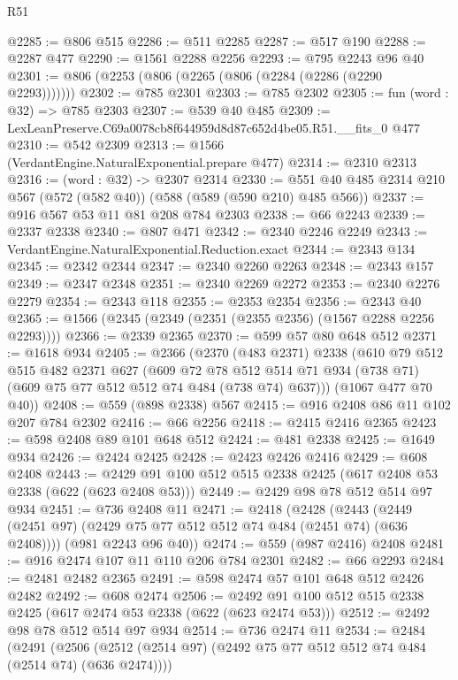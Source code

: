 \begin{lexlean}{R51}
\begin{coremodule}
@2285 := @806 @515
@2286 := @511 @2285
@2287 := @517 @190
@2288 := @2287 @477
@2290 := @1561 @2288 @2256
@2293 := @795 @2243 @96 @40
@2301 := @806 (@2253 (@806 (@2265 (@806 (@2284 (@2286 (@2290 @2293)))))))
@2302 := @785 @2301
@2303 := @785 @2302
@2305 := fun (word : @32) => @785 @2303
@2307 := @539 @40 @485
@2309 := LexLeanPreserve.C69a0078cb8f644959d8d87c652d4be05.R51.__fits_0 @477
@2310 := @542 @2309
@2313 := @1566 (VerdantEngine.NaturalExponential.prepare @477)
@2314 := @2310 @2313
@2316 := (word : @32) -> @2307 @2314
@2330 := @551 @40 @485 @2314 @210 @567 (@572 (@582 @40)) (@588 (@589 (@590 @210) @485 @566))
@2337 := @916 @567 @53 @11 @81 @208 @784 @2303
@2338 := @66 @2243
@2339 := @2337 @2338
@2340 := @807 @471
@2342 := @2340 @2246 @2249
@2343 := VerdantEngine.NaturalExponential.Reduction.exact
@2344 := @2343 @134
@2345 := @2342 @2344
@2347 := @2340 @2260 @2263
@2348 := @2343 @157
@2349 := @2347 @2348
@2351 := @2340 @2269 @2272
@2353 := @2340 @2276 @2279
@2354 := @2343 @118
@2355 := @2353 @2354
@2356 := @2343 @40
@2365 := @1566 (@2345 (@2349 (@2351 (@2355 @2356) (@1567 @2288 @2256 @2293))))
@2366 := @2339 @2365
@2370 := @599 @57 @80 @648 @512
@2371 := @1618 @934
@2405 := @2366
    (@2370
      (@483 @2371)
      @2338
      (@610
        @79
        @512
        @515
        @482
        @2371
        @627
        (@609
          @72
          @78
          @512
          @514
          @71
          @934
          (@738 @71)
          (@609 @75 @77 @512 @512 @74 @484 (@738 @74) @637)))
      (@1067 @477 @70 @40))
@2408 := @559 (@898 @2338) @567
@2415 := @916 @2408 @86 @11 @102 @207 @784 @2302
@2416 := @66 @2256
@2418 := @2415 @2416 @2365
@2423 := @598 @2408 @89 @101 @648 @512
@2424 := @481 @2338
@2425 := @1649 @934
@2426 := @2424 @2425
@2428 := @2423 @2426 @2416
@2429 := @608 @2408
@2443 := @2429 @91 @100 @512 @515 @2338 @2425 (@617 @2408 @53 @2338 (@622 (@623 @2408 @53)))
@2449 := @2429 @98 @78 @512 @514 @97 @934
@2451 := @736 @2408 @11
@2471 := @2418
    (@2428
      (@2443 (@2449 (@2451 @97) (@2429 @75 @77 @512 @512 @74 @484 (@2451 @74) (@636 @2408))))
      (@981 @2243 @96 @40))
@2474 := @559 (@987 @2416) @2408
@2481 := @916 @2474 @107 @11 @110 @206 @784 @2301
@2482 := @66 @2293
@2484 := @2481 @2482 @2365
@2491 := @598 @2474 @57 @101 @648 @512 @2426 @2482
@2492 := @608 @2474
@2506 := @2492 @91 @100 @512 @515 @2338 @2425 (@617 @2474 @53 @2338 (@622 (@623 @2474 @53)))
@2512 := @2492 @98 @78 @512 @514 @97 @934
@2514 := @736 @2474 @11
@2534 := @2484
    (@2491
      (@2506 (@2512 (@2514 @97) (@2492 @75 @77 @512 @512 @74 @484 (@2514 @74) (@636 @2474))))

\end{coremodule}
\end{lexlean}
